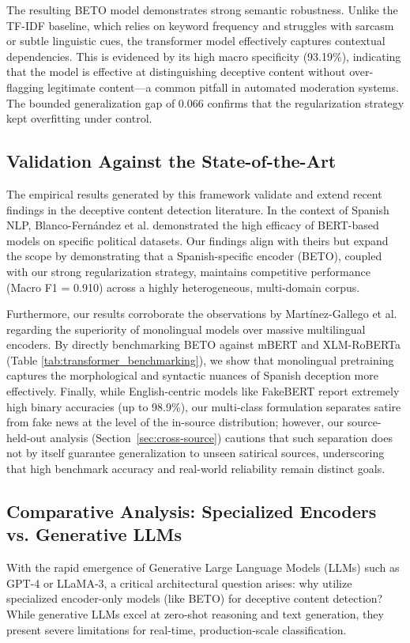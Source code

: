 \documentclass[informatics,article,submit,pdftex,moreauthors]{Definitions/mdpi}
\begin{document}
The resulting BETO model demonstrates strong semantic robustness. Unlike the TF-IDF baseline, which relies on keyword frequency and struggles with sarcasm or subtle linguistic cues, the transformer model effectively captures contextual dependencies. This is evidenced by its high macro specificity (93.19\%), indicating that the model is effective at distinguishing deceptive content without over-flagging legitimate content—a common pitfall in automated moderation systems. The bounded generalization gap of 0.066 confirms that the regularization strategy kept overfitting under control.

\subsection{Validation Against the State-of-the-Art}
The empirical results generated by this framework validate and extend recent findings in the deceptive content detection literature. In the context of Spanish NLP, Blanco-Fernández et al. \citep{blanco2024enhancing} demonstrated the high efficacy of BERT-based models on specific political datasets. Our findings align with theirs but expand the scope by demonstrating that a Spanish-specific encoder (BETO), coupled with our strong regularization strategy, maintains competitive performance (Macro F1 = 0.910) across a highly heterogeneous, multi-domain corpus. 

Furthermore, our results corroborate the observations by Martínez-Gallego et al. \citep{martinez2021fake} regarding the superiority of monolingual models over massive multilingual encoders. By directly benchmarking BETO against mBERT and XLM-RoBERTa (Table \ref{tab:transformer_benchmarking}), we show that monolingual pretraining captures the morphological and syntactic nuances of Spanish deception more effectively. Finally, while English-centric models like FakeBERT \citep{kaliyar2021fakebert} report extremely high binary accuracies (up to 98.9\%), our multi-class formulation separates satire from fake news at the level of the in-source distribution; however, our source-held-out analysis (Section~\ref{sec:cross-source}) cautions that such separation does not by itself guarantee generalization to unseen satirical sources, underscoring that high benchmark accuracy and real-world reliability remain distinct goals.

\subsection{Comparative Analysis: Specialized Encoders vs. Generative LLMs}
With the rapid emergence of Generative Large Language Models (LLMs) such as GPT-4 or LLaMA-3, a critical architectural question arises: why utilize specialized encoder-only models (like BETO) for deceptive content detection? While generative LLMs excel at zero-shot reasoning and text generation, they present severe limitations for real-time, production-scale classification. 
\end{document}
